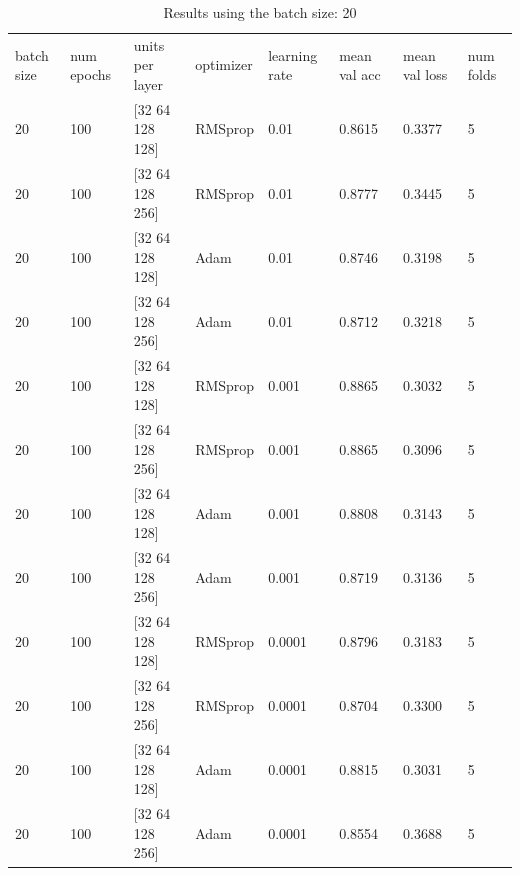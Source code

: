 \documentclass{book}
\begin{document}
            \begin{table}
                \begin{center}
                    \begin{tabular}{m{1cm}m{1cm}m{2.5cm}m{1.3cm}m{1cm}m{2cm}m{2cm}m{1cm}}
                        \midrule
                        batch size	& num epochs	& units per layer	& optimizer	& learning rate	& mean val acc	& mean val loss	& num folds \\
                        20	& 100	& [32  64  128  128]	& RMSprop	& 0.01	& 0.8615 & 0.3377 & 5 \\
                        \midrule
                        20	& 100	& [32  64  128  256]	& RMSprop	& 0.01	& 0.8777 & 0.3445 & 5 \\
                        \midrule
                        20	& 100	& [32  64  128  128]	& Adam	& 0.01	& 0.8746 & 0.3198 & 5 \\
                        \midrule
                        20	& 100	& [32  64  128  256]	& Adam	& 0.01	& 0.8712 & 0.3218 & 5 \\
                        \midrule
                        20	& 100	& [32  64  128  128]	& RMSprop	& 0.001	& 0.8865 & 0.3032 & 5 \\
                        \midrule
                        20	& 100	& [32  64  128  256]	& RMSprop	& 0.001	& 0.8865 & 0.3096 & 5 \\
                        \midrule
                        20	& 100	& [32  64  128  128]	& Adam	& 0.001	& 0.8808 & 0.3143 & 5 \\
                        \midrule
                        20	& 100	& [32  64  128  256]	& Adam	& 0.001	& 0.8719 & 0.3136 & 5 \\
                        \midrule
                        20	& 100	& [32  64  128  128]	& RMSprop	& 0.0001	& 0.8796 & 0.3183 & 5 \\
                        \midrule
                        20	& 100	& [32  64  128  256]	& RMSprop	& 0.0001	& 0.8704 & 0.3300 & 5 \\
                        \midrule
                        20	& 100	& [32  64  128  128]	& Adam	& 0.0001	& 0.8815 & 0.3031 & 5 \\
                        \midrule
                        20	& 100	& [32  64  128  256]	& Adam	& 0.0001	& 0.8554 & 0.3688 & 5 \\
                        \midrule
                    \end{tabular}
                \end{center}
                \caption{\label{tab:results}Results using the batch size: 20}
            \end{table}
\end{document}
